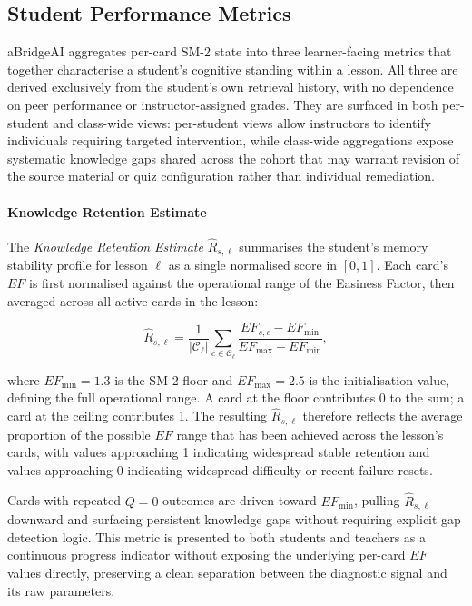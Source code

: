 \subsection{Student Performance Metrics}
\label{sec:performance_metrics}

aBridgeAI aggregates per-card SM-2 state into three learner-facing metrics that together characterise a student's cognitive standing within a lesson. All three are derived exclusively from the student's own retrieval history, with no dependence on peer performance or instructor-assigned grades. They are surfaced in both per-student and class-wide views: per-student views allow instructors to identify individuals requiring targeted intervention, while class-wide aggregations expose systematic knowledge gaps shared across the cohort that may warrant revision of the source material or quiz configuration rather than individual remediation.

\paragraph{Knowledge Retention Estimate}
The \textit{Knowledge Retention Estimate} $\hat{R}_{s,\ell}$ summarises the student's memory stability profile for lesson $\ell$ as a single normalised score in $[0, 1]$. Each card's $EF$ is first normalised against the operational range of the Easiness Factor, then averaged across all active cards in the lesson:

\begin{equation}
\hat{R}_{s,\ell} = \frac{1}{|\mathcal{C}_{\ell}|} 
\sum_{c \in \mathcal{C}_{\ell}} 
\frac{EF_{s,c} - EF_{\min}}{EF_{\max} - EF_{\min}},
\end{equation}

where $EF_{\min} = 1.3$ is the SM-2 floor and $EF_{\max} = 2.5$ is the initialisation value, defining the full operational range. A card at the floor contributes 0 to the sum; a card at the ceiling contributes 1. The resulting $\hat{R}_{s,\ell}$ therefore reflects the average proportion of the possible $EF$ range that has been achieved across the lesson's cards, with values approaching 1 indicating widespread stable retention and values approaching 0 indicating widespread difficulty or recent failure resets.

Cards with repeated $Q = 0$ outcomes are driven toward $EF_{\min}$, pulling $\hat{R}_{s,\ell}$ downward and surfacing persistent knowledge gaps without requiring explicit gap detection logic. This metric is presented to both students and teachers as a continuous progress indicator without exposing the underlying per-card $EF$ values directly, preserving a clean separation between the diagnostic signal and its raw parameters.

